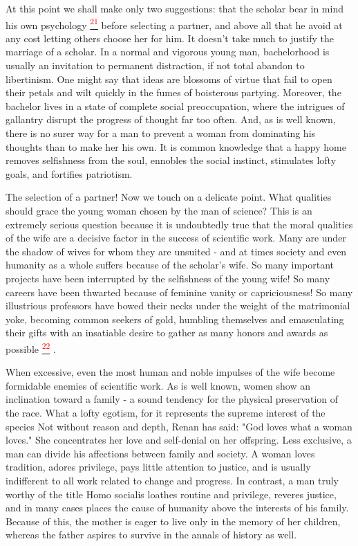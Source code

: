 \documentclass{article}
\newcommand{\noteref}[1]{%
 \hypertarget{ref:#1}{}%
 \hyperlink{note:#1}{\textsuperscript{\textcolor{red}{#1}}}%
}
\begin{document}
At this point we shall make only two suggestions: that the scholar bear in mind his own psychology\noteref{21} before selecting a partner, and above all that he avoid at any cost letting others choose her for him. It doesn’t take much to justify the marriage of a scholar. In a normal and vigorous young man, bachelorhood is usually an invitation to permanent distraction, if not total abandon to libertinism. One might say that ideas are blossoms of virtue that fail to open their petals and wilt quickly in the fumes of boisterous partying. Moreover, the bachelor lives in a state of complete social preoccupation, where the intrigues of gallantry disrupt the progress of thought far too often. And, as is well known, there is no surer way for a man to prevent a woman from dominating his thoughts than to make her his own. It is common knowledge that a happy home removes selfishness from the soul, ennobles the social instinct, stimulates lofty goals, and fortifies patriotism.

The selection of a partner! Now we touch on a delicate point. What qualities should grace the young woman chosen by the man of science? This is an extremely serious question because it is undoubtedly true that the moral qualities of the wife are a decisive factor in the success of scientific work. Many are under the shadow of wives for whom they are unsuited - and at times society and even humanity as a whole suffers because of the scholar’s wife. So many important projects have been interrupted by the selfishness of the young wife! So many careers have been thwarted because of feminine vanity or capriciousness! So many illustrious professors have bowed their necks under the weight of the matrimonial yoke, becoming common seekers of gold, humbling themselves and emasculating their gifts with an insatiable desire to gather as many honors and awards as possible\noteref{22}.

When excessive, even the most human and noble impulses of the wife become formidable enemies of scientific work. As is well known, women show an inclination toward a family - a sound tendency for the physical preservation of the race. What a lofty egotism, for it represents the supreme interest of the species\! Not without reason and depth, Renan has said: "God loves what a woman loves." She concentrates her love and self-denial on her offspring. Less exclusive, a man can divide his affections between family and society. A woman loves tradition, adores privilege, pays little attention to justice, and is usually indifferent to all work related to change and progress. In contrast, a man truly worthy of the title Homo socialis loathes routine and privilege, reveres justice, and in many cases places the cause of humanity above the interests of his family. Because of this, the mother is eager to live only in the memory of her children, whereas the father aspires to survive in the annals of history as well.
\end{document}
